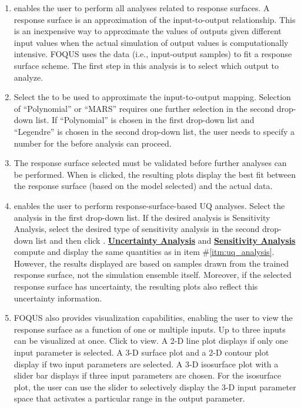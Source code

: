 \begin{enumerate}
{\begin{figure}[!htb]
		\label{fig:uq_analysisW2}
	\end{figure}
	\label{itm:uq_analysis}
}
\item
	 enables the user to perform all analyses related to
	response surfaces. A response surface is an approximation of the
	input-to-output relationship. This is an inexpensive way to approximate
	the values of outputs given different input values when the actual
	simulation of output values is computationally intensive. FOQUS uses the
	data (i.e., input-output samples) to fit a response surface scheme. The
	first step in this analysis is to select which output to analyze.
\item
	Select the  to be used to approximate the
	input-to-output mapping. Selection of ``Polynomial'' or ``MARS''
	requires one further selection in the second drop-down list. If
	``Polynomial'' is chosen in the first drop-down list and ``Legendre'' is
	chosen in the second drop-down list, the user needs to specify a number for
	the  before analysis can proceed.
	\label{itm:uq_rs}
\item
	The response surface selected must be validated before further analyses
	can be performed. When  is clicked, the resulting plots
	display the best fit between the response surface (based on the
	model selected) and the actual data.
\item
	 enables the user to perform
	response-surface-based UQ analyses. 
   Select the analysis in the first drop-down list. If the desired analysis is Sensitivity Analysis, select the desired type of sensitivity
	analysis in the second drop-down list and then
	click . \textbf{\underline{Uncertainty Analysis}} and \textbf{\underline{Sensitivity Analysis}}
	compute and display the same quantities as in item
	\#\ref{itm:uq_analysis}. However, the results displayed are based on
	samples drawn from the trained response surface, not the simulation
	ensemble itself. Moreover, if the selected response surface has
	uncertainty, the resulting plots also reflect this uncertainty
	information.
\item
	FOQUS also provides visualization capabilities, enabling the user to 
   view the response surface as a function of one or multiple inputs. 
   Up to three inputs can be visualized at once. Click  to view. 
   A 2-D line plot displays if only one input parameter is selected. A 3-D
	surface plot and a 2-D contour plot display if two input parameters are
	selected. A 3-D isosurface plot with a slider bar displays if three
	input parameters are chosen. For the isosurface plot, the user can use
	the slider to selectively display the
	3-D input parameter space that activates a particular range in the
	output parameter. %


\end{enumerate}
